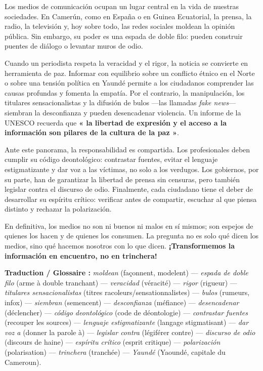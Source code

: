 \documentclass[11pt]{article}
\newcounter{popsec}
\newcounter{popsub}
\newcommand{\courssub}[1]{%
  \stepcounter{popsub}%
  \par\vspace{9pt}\noindent{\popxbold\fontsize{11.5}{13}\selectfont\color{popink}{\color{poporange}\thepopsec.\thepopsub}\hspace{6pt}#1}\par\nopagebreak\vspace{4pt}
}
\begin{document}
\courssub{Texte support de la leçon}
\begin{textebox}
Los medios de comunicación ocupan un lugar central en la vida de nuestras sociedades. En Camerún, como en España o en Guinea Ecuatorial, la prensa, la radio, la televisión y, hoy sobre todo, las redes sociales moldean la opinión pública. Sin embargo, su poder es una espada de doble filo: pueden construir puentes de diálogo o levantar muros de odio.

Cuando un periodista respeta la veracidad y el rigor, la noticia se convierte en herramienta de paz. Informar con equilibrio sobre un conflicto étnico en el Norte o sobre una tensión política en Yaundé permite a los ciudadanos comprender las causas profundas y fomenta la empatía. Por el contrario, la manipulación, los titulares sensacionalistas y la difusión de bulos —las llamadas \emph{fake news}— siembran la desconfianza y pueden desencadenar violencia. Un informe de la UNESCO recuerda que \textbf{« la libertad de expresión y el acceso a la información son pilares de la cultura de la paz »}.

Ante este panorama, la responsabilidad es compartida. Los profesionales deben cumplir su código deontológico: contrastar fuentes, evitar el lenguaje estigmatizante y dar voz a las víctimas, no solo a los verdugos. Los gobiernos, por su parte, han de garantizar la libertad de prensa sin censuras, pero también legislar contra el discurso de odio. Finalmente, cada ciudadano tiene el deber de desarrollar su espíritu crítico: verificar antes de compartir, escuchar al que piensa distinto y rechazar la polarización.

En definitiva, los medios no son ni buenos ni malos en sí mismos; son espejos de quienes los hacen y de quienes los consumen. La pregunta no es solo qué dicen los medios, sino qué hacemos nosotros con lo que dicen. \textbf{¡Transformemos la información en encuentro, no en trinchera!}
\par\medskip
\textbf{Traduction / Glossaire :} \emph{moldean} (façonnent, modelent) — \emph{espada de doble filo} (arme à double tranchant) — \emph{veracidad} (véracité) — \emph{rigor} (rigueur) — \emph{titulares sensacionalistas} (titres racoleurs/sensationnalistes) — \emph{bulos} (rumeurs, infox) — \emph{siembran} (semencent) — \emph{desconfianza} (méfiance) — \emph{desencadenar} (déclencher) — \emph{código deontológico} (code de déontologie) — \emph{contrastar fuentes} (recouper les sources) — \emph{lenguaje estigmatizante} (langage stigmatisant) — \emph{dar voz a} (donner la parole à) — \emph{legislar contra} (légiférer contre) — \emph{discurso de odio} (discours de haine) — \emph{espíritu crítico} (esprit critique) — \emph{polarización} (polarisation) — \emph{trinchera} (tranchée) — \emph{Yaundé} (Yaoundé, capitale du Cameroun).
\end{textebox}
\end{document}
